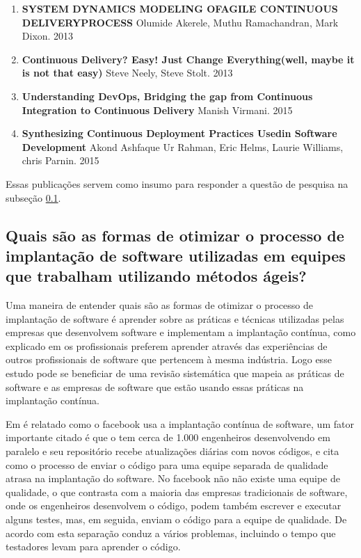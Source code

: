 \documentclass[12pt]{article}
\begin{document}
\begin{enumerate}
\begin{enumerate}
    	\item \textbf{SYSTEM DYNAMICS MODELING OFAGILE CONTINUOUS DELIVERYPROCESS} Olumide Akerele, Muthu Ramachandran, Mark Dixon. 2013
    	\item \textbf{Continuous Delivery? Easy! Just Change Everything(well, maybe it is not that easy)} Steve Neely, Steve Stolt.  2013 
    	\item \textbf{Understanding DevOps, Bridging the gap from Continuous Integration to Continuous Delivery} Manish Virmani.  2015
    	\item \textbf{Synthesizing Continuous Deployment Practices Usedin Software Development} Akond Ashfaque Ur Rahman, Eric Helms, Laurie Williams, chris Parnin. 2015
	\end{enumerate}
\end{enumerate}

Essas publicações servem como insumo para responder a questão de pesquisa na subseção \ref{sec5:subsec1}.

\subsection{Quais são as formas de otimizar o processo de implantação de software utilizadas em equipes que trabalham utilizando métodos ágeis?} \label{sec5:subsec1}

Uma maneira de entender quais são as formas de otimizar o processo de implantação de software é aprender sobre as práticas e técnicas utilizadas pelas empresas que desenvolvem software e implementam a implantação contínua, como explicado em  \cite{7284592} os profissionais preferem aprender através das experiências de outros profissionais de software que pertencem à mesma indústria. Logo esse estudo pode se beneficiar de uma revisão sistemática que mapeia as práticas de software e as empresas de software que estão usando essas práticas na implantação contínua.

Em \cite{6449236} é relatado como o facebook usa a implantação contínua de software, um fator importante citado é que o tem cerca de 1.000 engenheiros desenvolvendo em paralelo e seu repositório recebe atualizações diárias com novos códigos, e cita como o processo de enviar o código para uma equipe separada de qualidade atrasa na implantação do software. No facebook não não existe uma equipe de qualidade, o que contrasta com a maioria das empresas tradicionais de software, onde os engenheiros desenvolvem o código, podem também escrever e executar alguns testes, mas, em seguida, enviam o código para a equipe de qualidade. De acordo com \cite{6449236} esta separação conduz a vários problemas, incluindo o tempo que testadores levam para aprender o código.
\end{document}
